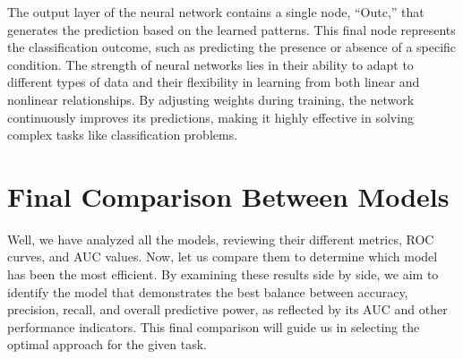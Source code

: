 \documentclass[
]{article}
\begin{document}
The output layer of the neural network contains a single node, ``Outc,''
that generates the prediction based on the learned patterns. This final
node represents the classification outcome, such as predicting the
presence or absence of a specific condition. The strength of neural
networks lies in their ability to adapt to different types of data and
their flexibility in learning from both linear and nonlinear
relationships. By adjusting weights during training, the network
continuously improves its predictions, making it highly effective in
solving complex tasks like classification problems.

\newpage

\section{Final Comparison Between
Models}\label{final-comparison-between-models}

Well, we have analyzed all the models, reviewing their different
metrics, ROC curves, and AUC values. Now, let us compare them to
determine which model has been the most efficient. By examining these
results side by side, we aim to identify the model that demonstrates the
best balance between accuracy, precision, recall, and overall predictive
power, as reflected by its AUC and other performance indicators. This
final comparison will guide us in selecting the optimal approach for the
given task.
\end{document}
